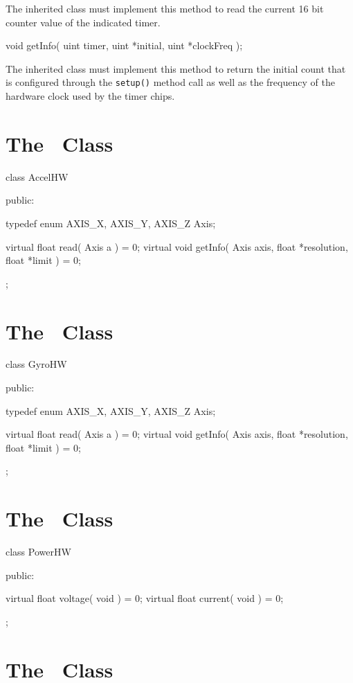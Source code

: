 The inherited class must implement this method to read the current 16 bit
counter value of the indicated timer.

\begin{prototype}
void getInfo( uint timer, uint *initial, uint *clockFreq );
\end{prototype}

The inherited class must implement this method to return the initial count
that is configured through the {\tt setup()} method call as well as the
frequency of the hardware clock used by the timer chips.

\section{The \AccelHW\ Class}
\label{sec:accel_class}

\begin{classdef}
class AccelHW {
public:

  typedef enum { AXIS_X, AXIS_Y, AXIS_Z } Axis;

  virtual float read( Axis a ) = 0;
  virtual void  getInfo( Axis axis, float *resolution, float *limit ) = 0;
};
\end{classdef}

\section{The \GyroHW\ Class}
\label{sec:gyro_class}

\begin{classdef}
class GyroHW {
public:
    
  typedef enum { AXIS_X, AXIS_Y, AXIS_Z } Axis;
    
  virtual float read( Axis a ) = 0;
  virtual void  getInfo( Axis axis, float *resolution, float *limit ) = 0;
};
\end{classdef}

\section{The \PowerHW\ Class}
\label{sec:power_class}

\begin{classdef}
class PowerHW {
public:

  virtual float voltage( void ) = 0;
  virtual float current( void ) = 0;
};
\end{classdef}

\section{The \SwitchHW\ Class}
\label{sec:switch_class}

